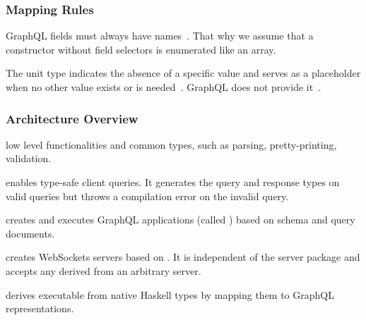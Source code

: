 \begin{frame}\frametitle{Mapping Rules}

\footnotesize
\begin{itemize}

   GraphQL fields must always have names~\cite{gql-spec}. That why we assume that a constructor without field selectors is enumerated like an array.
  

   The unit type indicates the absence of a specific value and serves as a placeholder when no other value exists or is needed~\cite{fsharp-unit}. GraphQL does not provide it~\cite{gql-spec}. 


\end{itemize}
\end{frame}


\begin{frame}\frametitle{Architecture Overview}
  \begin{enumerate} 
  
    \footnotesize

     low level functionalities and common types, such as  parsing, pretty-printing, validation.
  
     enables type-safe client queries. It generates the query and response types on valid queries but throws a compilation error on the invalid query.
  
     creates and executes GraphQL applications (called ) based on schema and query documents.
    
      creates WebSockets servers based on . It is independent of the server package and accepts any  derived from an arbitrary server.
  
     derives executable  from native Haskell types by mapping them to GraphQL representations. 
  
  \end{enumerate}

\end{frame}


